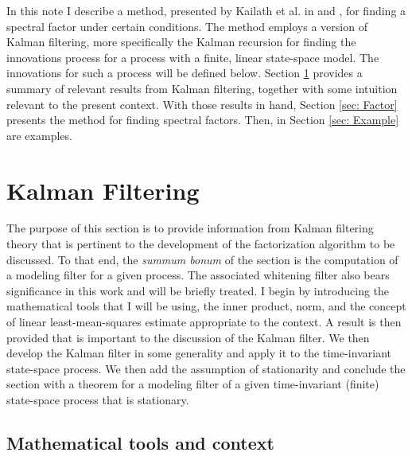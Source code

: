 \documentclass[12pt]{amsart}
\begin{document}
In this note I describe a method, presented by Kailath et al. in \cite{sayed2001} and \cite[p.~336]{kailath2000}, for finding a spectral factor under certain conditions. The method employs a version of Kalman filtering, more specifically the Kalman recursion for finding the innovations process for a process with a finite, linear state-space model. The innovations for such a process will be defined below. Section \ref{sec: Kalman} provides a summary of relevant results from Kalman filtering, together with some intuition relevant to the present context. With those results in hand, Section \ref{sec: Factor} presents the method for finding spectral factors. Then, in Section \ref{sec: Example} are examples.  

\section{Kalman Filtering}
\label{sec: Kalman}

The purpose of this section is to provide information from Kalman filtering theory that is pertinent to the development of the factorization algorithm to be discussed. To that end, the \textit{summum bonum} of the section is the computation of a modeling filter for a given process. The associated whitening filter also bears significance in this work and will be briefly treated. I begin by introducing the mathematical tools that I will be using, the inner product, norm, and the concept of linear least-mean-squares estimate appropriate to the context. A result is then provided that is important to the discussion of the Kalman filter. We then develop the Kalman filter in some generality and apply it to the time-invariant state-space process. We then add the assumption of stationarity and conclude the section with a theorem for a modeling filter of a given time-invariant (finite) state-space process that is stationary.




\subsection{Mathematical tools and context}
\end{document}
